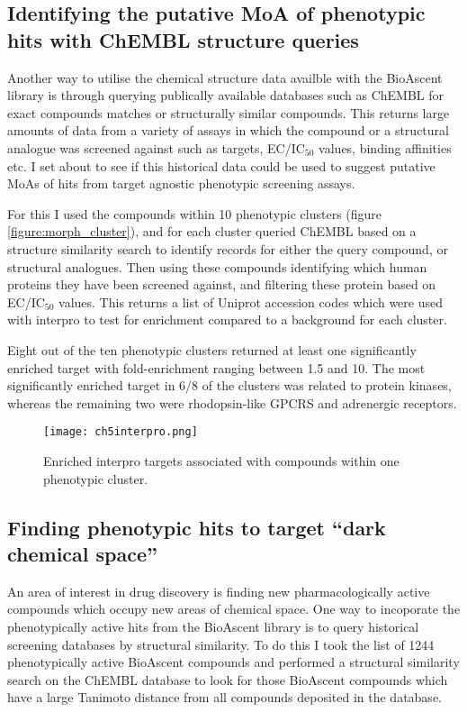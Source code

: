 \documentclass[a4paper,11pt,twoside,openright]{scrbook}
\begin{document}
\subsection{Identifying the putative MoA of phenotypic hits with ChEMBL structure queries}

Another way to utilise the chemical structure data availble with the BioAscent library is through querying publically available databases such as ChEMBL for exact compounds matches or structurally similar compounds.
This returns large amounts of data from a variety of assays in which the compound or a structural analogue was screened against such as targets, EC/IC$_{50}$ values, binding affinities etc.
I set about to see if this historical data could be used to suggest putative MoAs of hits from target agnostic phenotypic screening assays.

For this I used the compounds within 10 phenotypic clusters (figure \ref{figure:morph_cluster}), and for each cluster queried ChEMBL based on a structure similarity search to identify records for either the query compound, or structural analogues.
Then using these compounds identifying which human proteins they have been screened against, and filtering these protein based on EC/IC$_{50}$ values.
This returns a list of Uniprot accession codes which were used with interpro \cite{Finn2017} to test for enrichment compared to a background for each cluster.

Eight out of the ten phenotypic clusters returned at least one significantly enriched target with fold-enrichment ranging between 1.5 and 10.
The most significantly enriched target in 6/8 of the clusters was related to protein kinases, whereas the remaining two were rhodopsin-like GPCRS and adrenergic receptors.

\begin{figure}
    \captionsetup{width=0.8\textwidth}
    \caption[Interpro target enrichment]{
        Enriched interpro targets associated with compounds within one phenotypic cluster.
}
    \texttt{[image: ch5interpro.png]}
    \label{figure:interpro}
\end{figure}



\subsection{Finding phenotypic hits to target ``dark chemical space''}

An area of interest in drug discovery is finding new pharmacologically active compounds which occupy new areas of chemical space. \cite{Wassermann2015}
One way to incoporate the phenotypically active hits from the BioAscent library is to query historical screening databases by structural similarity.
To do this I took the list of 1244 phenotypically active BioAscent compounds and performed a structural similarity search on the ChEMBL database to look for those BioAscent compounds which have a large Tanimoto distance from all compounds deposited in the database.
\end{document}
